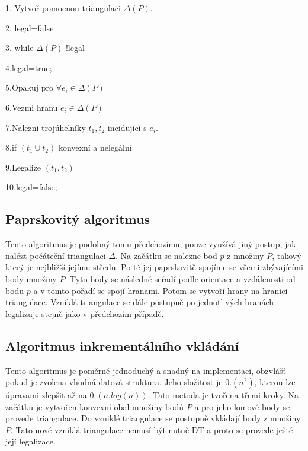 \documentclass[12pt,a4paper]{article}
\begin{document}

1. Vytvoř pomocnou triangulaci $\Delta(P)$.

2. legal=false

3. while $\Delta(P)$ !legal

4.\indent legal=true;

5.\indent Opakuj pro $\forall e_i \in \Delta(P)$

6.\indent \indent Vezmi hranu $e_i \in \Delta(P)$

7.\indent \indent Nalezni trojúhelníky $t_1,t_2$ incidující s $e_i$.

8.\indent \indent if $(t_1 \cup t_2)$ konvexní a nelegální

9.\indent \indent \indent  Legalize $(t_1,t_2)$

10.\indent \indent \indent legal=false;


\subsection{Paprskovitý algoritmus}

Tento algoritmus je podobný tomu předchozímu, pouze využívá jiný postup, jak nalézt počáteční triangulaci $\Delta$. Na začátku se nalezne bod $p$ z množiny $P$, takový který je nejbližší jejímu středu. Po té jej paprskovitě spojíme se všemi zbývajícími body množiny $P$. Tyto body se následně seřadí podle orientace a vzdálenosti od bodu $p$ a v tomto pořadí se spojí hranami. Potom se vytvoří hrany na hranici triangulace. Vzniklá triangulace se dále postupně po jednotlivých hranách legalizuje stejně jako v předchozím případě.


\subsection{Algoritmus inkrementálního vkládání}

Tento algoritmus je poměrně jednoduchý a snadný na implementaci, obzvlášť pokud je zvolena vhodná datová struktura. Jeho složitost je $0.(n^2)$, kterou lze úpravami zlepšit až na $0.(n.log(n))$. Tato metoda je tvořena třemi kroky. Na začátku je vytvořen konvexní obal množiny bodů $P$ a pro jeho lomové body se provede triangulace. Do vzniklé triangulace se postupně vkládají body z množiny $P$. Tato nově vzniklá triangulace nemusí být nutně DT a proto se provede ještě její legalizace.
\end{document}
